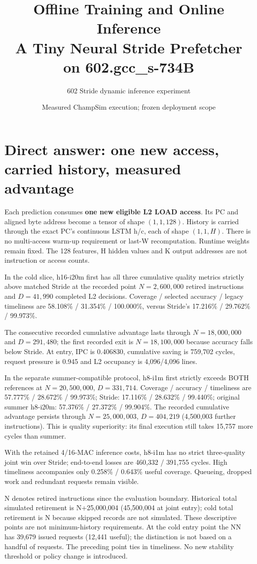 \documentclass[10pt]{article}
\title{Offline Training and Online Inference\\\large A Tiny Neural Stride Prefetcher on 602.gcc\_s-734B}
\author{602 Stride dynamic inference experiment}
\date{Measured ChampSim execution; frozen deployment scope}
\begin{document}
\maketitle
\section{Direct answer: one new access, carried history, measured advantage}

Each prediction consumes \textbf{one new eligible L2 LOAD access}. Its PC and aligned byte address become a tensor of shape $(1,1,128)$. History is carried through the exact PC's continuous LSTM h/c, each of shape $(1,1,H)$. There is no multi-access warm-up requirement or last-W recomputation. Runtime weights remain fixed. The 128 features, H hidden values and K output addresses are not instruction or access counts.

In the cold slice, h16-i20m first has all three cumulative quality metrics strictly above matched Stride at the recorded point $N=2,600,000$ retired instructions and $D=41,990$ completed L2 decisions. Coverage / selected accuracy / legacy timeliness are 58.108\% / 31.354\% / 100.000\%, versus Stride's 17.216\% / 29.762\% / 99.973\%.

The consecutive recorded cumulative advantage lasts through $N=18,000,000$ and $D=291,480$; the first recorded exit is $N=18,100,000$ because accuracy falls below Stride. At entry, IPC is 0.406830, cumulative saving is 759,702 cycles, request pressure is 0.945 and L2 occupancy is 4,096/4,096 lines.

In the separate summer-compatible protocol, h8-i1m first strictly exceeds BOTH references at $N=20,500,000$, $D=331,714$. Coverage / accuracy / timeliness are 57.777\% / 28.672\% / 99.973\%; Stride: 17.116\% / 28.632\% / 99.440\%; original summer h8-i20m: 57.376\% / 27.372\% / 99.904\%. The recorded cumulative advantage persists through $N=25,000,003$, $D=404,219$ (4,500,003 further instructions). This is quality superiority: its final execution still takes 15,757 more cycles than summer.

With the retained 4/16-MAC inference costs, h8-i1m has no strict three-quality joint win over Stride; end-to-end losses are 460,332 / 391,755 cycles. High timeliness accompanies only 0.258\% / 0.643\% useful coverage. Queueing, dropped work and redundant requests remain visible.

N denotes retired instructions since the evaluation boundary. Historical total simulated retirement is N+25,000,004 (45,500,004 at joint entry); cold total retirement is N because skipped records are not simulated. These descriptive points are not minimum-history requirements. At the cold entry point the NN has 39,679 issued requests (12,441 useful); the distinction is not based on a handful of requests. The preceding point ties in timeliness. No new stability threshold or policy change is introduced.
\end{document}
